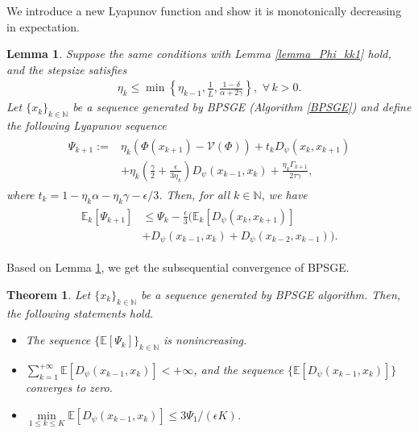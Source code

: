 \documentclass[letterpaper]{article} %
\newtheorem{theorem}{Theorem}
\newtheorem{lemma}{Lemma}
\begin{document}
	We introduce a new  Lyapunov function and show it is monotonically decreasing in expectation.
	\begin{lemma}\label{lyapunov_descent}
		Suppose the same conditions with Lemma \ref{lemma_Phi_kk1} hold, and  the stepsize satisfies
		\begin{eqnarray}
			\eta_{k}\le \min\left\{\eta_{k-1}, \frac{1}{\bar{L}}, \frac{1-\delta}{\alpha+2\gamma}\right\}, \,\, \forall\, k>0. \label{stepsize_set}
		\end{eqnarray}
		Let $\{x_{k}\}_{k\in\mathbb{N}}$ be a sequence generated by BPSGE (Algorithm \ref{BPSGE}) and define the following Lyapunov sequence
		\begin{eqnarray}
			\begin{aligned}
				\Psi_{k+1}:= &\eta_{k}(\Phi(x_{k+1}) -\mathcal{V}(\Phi))  +t_{k}D_{\psi}(x_{k},x_{k+1})\\
				&+\eta_{k}\left(\frac{\gamma}{2}+\frac{\epsilon}{3\eta_{k}}\right)D_{\psi}(x_{k-1},x_{k})+\frac{\eta_{k}\Gamma_{k+1}}{2\tau\gamma}, \label{lyapunov_function}
			\end{aligned}
		\end{eqnarray}
		where $t_{k}=1-\eta_{k}\alpha-\eta_{k}\gamma-\epsilon/3$. Then, for all $k\in\mathbb{N}$, we have
		\begin{eqnarray}
			\begin{aligned} %
				\mathbb{E}_{k}[\Psi_{k+1}]&\le\Psi_{k}-\frac{\epsilon}{3}(\mathbb{E}_{k}[D_{\psi}(x_{k},x_{k+1})]\\
				&+D_{\psi}(x_{k-1},x_{k})+D_{\psi}(x_{k-2},x_{k-1})).
			\end{aligned}\label{decent_inequality_01}
		\end{eqnarray}
	\end{lemma}

	Based on Lemma \ref{lyapunov_descent}, we get the subsequential convergence of BPSGE.
	\begin{theorem}\label{subsequence_convergence}
		Let $\{x_{k}\}_{k\in\mathbb{N}}$ be a sequence generated by BPSGE algorithm. Then, the following statements hold.
		\begin{itemize}
			\item The sequence $\{\mathbb{E}[\Psi_{k}]\}_{k\in\mathbb{N}}$ is nonincreasing.
			\item $\sum\limits_{k=1}^{+\infty}\mathbb{E}[D_{\psi}(x_{k-1},x_{k})]<+\infty$,
			and    the sequence $\{\mathbb{E}[ D_{\psi}(x_{k-1}, x_{k}) ]\}$  %
			converges to zero.
			\item $\min\limits_{1\le k\le K}\mathbb{E}[D_{\psi}(x_{k-1},x_{k})]\le 3\Psi_{1}/(\epsilon K)$.
		\end{itemize}
	\end{theorem}
\end{document}
